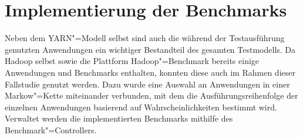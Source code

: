 \chapter{Implementierung der Benchmarks}
\label{ch:benchmarks}

Neben dem \ac{YARN}"=Modell selbst sind auch die während der Testausführung genutzten Anwendungen ein wichtiger Bestandteil des gesamten Testmodells.
Da Hadoop selbst sowie die Plattform Hadoop"=Benchmark bereits einige Anwendungen und Benchmarks enthalten, konnten diese auch im Rahmen dieser Fallstudie genutzt werden.
Dazu wurde eine Auswahl an Anwendungen in einer Markow"=Kette miteinander verbunden, mit dem die Ausführungsreihenfolge der einzelnen Anwendungen basierend auf Wahrscheinlichkeiten bestimmt wird.
Verwaltet werden die implementierten Benchmarks mithilfe des Benchmark"=Controllers.





